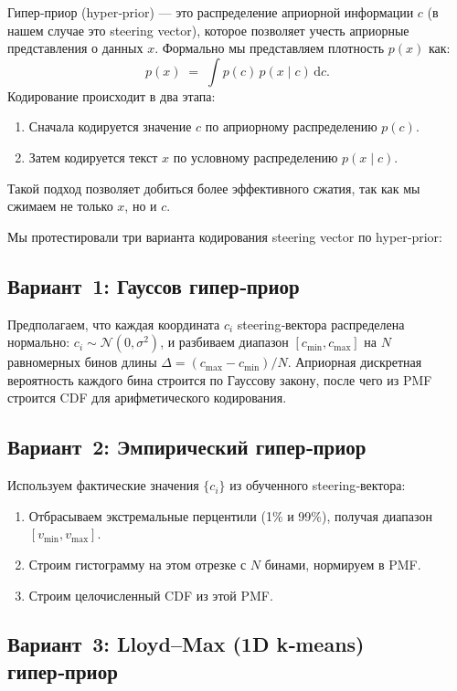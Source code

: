 \documentclass[a4paper,11pt]{article}
\begin{document}
Гипер‑приор (hyper‑prior) — это распределение априорной информации $c$ (в нашем случае это steering vector), которое позволяет учесть априорные представления о данных $x$. Формально мы представляем плотность $p(x)$ как:
\[
  p(x) \;=\;\int p(c)\,p(x\mid c)\,\mathrm{d}c.
\]
Кодирование происходит в два этапа:
\begin{enumerate}
  \item Сначала кодируется значение $c$ по априорному распределению $p(c)$.
  \item Затем кодируется текст $x$ по условному распределению $p(x\mid c)$.
\end{enumerate}
Такой подход позволяет добиться более эффективного сжатия, так как мы сжимаем не только $x$, но и $c$.

Мы протестировали три варианта кодирования steering vector по hyper‑prior:

\subsection*{Вариант 1: Гауссов гипер‑приор}

Предполагаем, что каждая координата $c_i$ steering‑вектора распределена нормально: $c_i \sim \mathcal{N}(0,\sigma^2)$, и разбиваем диапазон $[c_{\min},c_{\max}]$ на $N$ равномерных бинов длины $\Delta=(c_{\max}-c_{\min})/N$. Априорная дискретная вероятность каждого бина строится по Гауссову закону, после чего из PMF строится CDF для арифметического кодирования.

\subsection*{Вариант 2: Эмпирический гипер‑приор}

Используем фактические значения $\{c_i\}$ из обученного steering‑вектора:
\begin{enumerate}
  \item Отбрасываем экстремальные перцентили (1\% и 99\%), получая диапазон $[v_{\min},v_{\max}]$.
  \item Строим гистограмму на этом отрезке с $N$ бинами, нормируем в PMF.
  \item Строим целочисленный CDF из этой PMF.
\end{enumerate}

\subsection*{Вариант 3: Lloyd–Max (1D k‑means) гипер‑приор}
\end{document}
